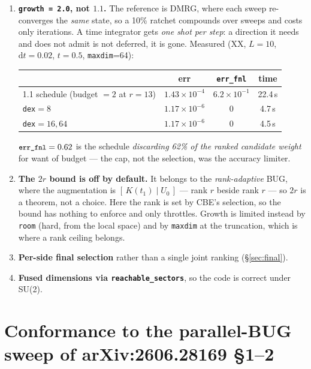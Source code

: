 \documentclass[11pt,a4paper]{article}
\newcommand{\code}[1]{\texttt{\small #1}}
\newcommand{\dd}{\mathrm{d}}
\begin{document}
\begin{enumerate}[leftmargin=1.6em]
\item \textbf{\code{growth = 2.0}, not $1.1$.} The reference is DMRG, where each sweep
  re-converges the \emph{same} state, so a 10\% ratchet compounds over sweeps and costs only
  iterations. A time integrator gets \emph{one shot per step}: a direction it needs and does not
  admit is not deferred, it is gone. Measured (XX, $L=10$, $\dd t=0.02$, $t=0.5$, \code{maxdim}=64):
  \begin{center}\small
  \begin{tabular}{@{}lccc@{}}
  \toprule & err & \code{err\_fnl} & time \\ \midrule
  1.1 schedule (budget $=2$ at $r=13$) & $1.43\times10^{-4}$ & $6.2\times10^{-1}$ & 22.4\,s \\
  \code{dex}$=8$ & $1.17\times10^{-6}$ & 0 & 4.7\,s \\
  \code{dex}$=16,64$ & $1.17\times10^{-6}$ & 0 & 4.5\,s \\
  \bottomrule
  \end{tabular}\end{center}
  $\code{err\_fnl}=0.62$ is the schedule \emph{discarding 62\% of the ranked candidate weight}
  for want of budget --- the cap, not the selection, was the accuracy limiter.

\item \textbf{The $2r$ bound is off by default.} It belongs to the \emph{rank-adaptive} BUG,
  where the augmentation is $[\,K(t_1)\mid U_0\,]$ --- rank $r$ beside rank $r$ --- so $2r$ is a
  theorem, not a choice. Here the rank is set by CBE's selection, so the bound has nothing to
  enforce and only throttles. Growth is limited instead by \code{room} (hard, from the local
  space) and by \code{maxdim} at the truncation, which is where a rank ceiling belongs.

\item \textbf{Per-side final selection} rather than a single joint ranking (\S\ref{sec:final}).

\item \textbf{Fused dimensions via \code{reachable\_sectors}}, so the code is correct under SU(2).
\end{enumerate}

\section{Conformance to the parallel-BUG sweep of arXiv:2606.28169 \S1--2}
\label{sec:conformance}
\end{document}
